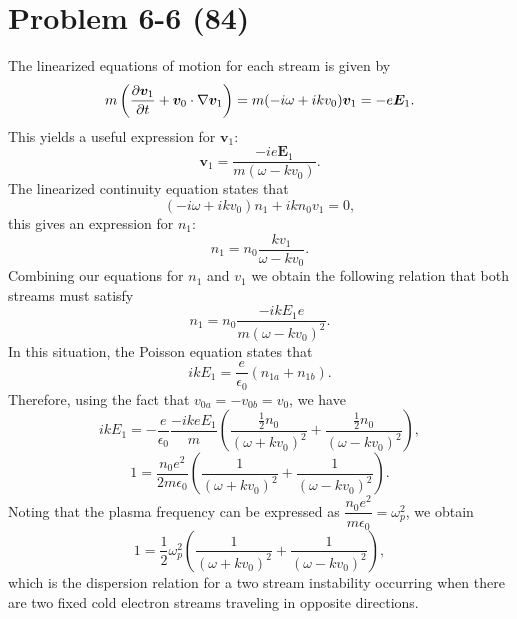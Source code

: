 \section*{Problem 6-6 (84)}
\label{sec:6-6}
The linearized equations of motion for each stream is given by
\begin{equation*}
	m\left(\frac{\partial \bm{v}_1}{\partial t} + \bm{v}_0\cdot\nabla \bm{v}_1 \right) = m(-i\omega + ikv_0)\bm{v}_1 = -e\bm{E}_1.
\end{equation*}
This yields a useful expression for \(\bm{v}_1 \):
\begin{equation*}
	\bm{v}_1 = \dfrac{-ie\bm{E}_1}{m(\omega - kv_0)}.
\end{equation*}
The linearized continuity equation states that 
\begin{equation*}
	(-i\omega + ikv_0)n_1 + ikn_0v_1 = 0,
\end{equation*}
this gives an expression for \(n_1\):
\begin{equation*}
	n_1 = n_0 \dfrac{kv_1}{\omega-kv_0}.
\end{equation*}
Combining our equations for \(n_1\) and \(v_1\) we obtain the following relation that both streams must satisfy
\begin{equation*}
	n_1 = n_0\dfrac{-ikE_1e}{m(\omega - kv_0)^2}.
\end{equation*}
In this situation, the Poisson equation states that 
\begin{equation*}
	ikE_1 = \dfrac{e}{\epsilon_0}\left(n_{1a} + n_{1b}\right).
\end{equation*}
Therefore, using the fact that \(v_{0a} = -v_{0b} = v_0 \), we have
\begin{equation*}
	ikE_1 = -\dfrac{e}{\epsilon_0}\dfrac{-ikeE_1}{m}\left(\dfrac{\frac{1}{2}n_0}{(\omega + kv_0)^2} + \dfrac{\frac{1}{2}n_0}{(\omega - kv_0)^2}\right),
\end{equation*}
\begin{equation*}
	1 = \dfrac{n_0e^2}{2m\epsilon_0}\left(\dfrac{1}{(\omega + kv_0)^2} + \dfrac{1}{(\omega - kv_0)^2}\right).
\end{equation*}
Noting that the plasma frequency can be expressed as \(\dfrac{n_0e^2}{m\epsilon_0} = \omega_p^2 \), we obtain
\begin{equation*}
1 = \dfrac{1}{2}\omega_p^2\left(\dfrac{1}{(\omega + kv_0)^2} + \dfrac{1}{(\omega - kv_0)^2}\right),
\end{equation*}
which is the dispersion relation for a two stream instability occurring when there are two fixed cold electron streams traveling in opposite directions.

